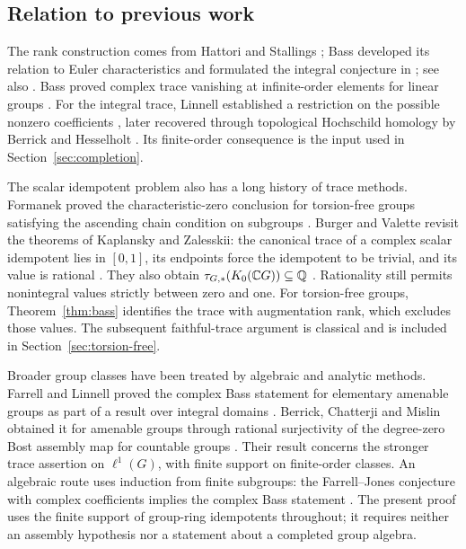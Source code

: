 \subsection{Relation to previous work}

The rank construction comes from Hattori and Stallings
\cite{Hattori1965,Stallings1965}; Bass developed its relation to Euler
characteristics and formulated the integral conjecture in
\cite{Bass1976}; see also \cite[Conjecture (4.5)]{Bass1979}.
Bass proved complex trace vanishing at infinite-order elements for linear
groups \cite[Theorem (6.1)(f)]{Bass1979}. For the integral trace,
Linnell established a restriction on the possible nonzero coefficients
\cite[Lemma 4.1]{Linnell1983}, later recovered through topological
Hochschild homology by Berrick and Hesselholt \cite[Theorem A]{BH2015}.
Its finite-order consequence is the input used in
Section~\ref{sec:completion}.

The scalar idempotent problem also has a long history of trace methods.
Formanek proved the characteristic-zero conclusion for torsion-free
groups satisfying the ascending chain condition on subgroups
\cite[Theorem 1]{Formanek1973}. Burger and Valette revisit the theorems of
Kaplansky and Zalesskii: the canonical trace of a complex scalar
idempotent lies in $[0,1]$, its endpoints force the idempotent to be
trivial, and its value is rational
\cite[Theorems 1.3 and 2.1]{BV1998}. They also obtain
$\tau_{G,*}(K_0(\mathbb C G))\subseteq\mathbb Q$
\cite[Corollary 1.2]{BV1998}. Rationality still permits nonintegral
values strictly between zero and one. For torsion-free groups,
Theorem~\ref{thm:bass} identifies the trace with augmentation rank,
which excludes those values. The subsequent faithful-trace argument
is classical and is included in Section~\ref{sec:torsion-free}.

Broader group classes have been treated by algebraic and analytic
methods. Farrell and Linnell proved the complex Bass statement for
elementary amenable groups as part of a result over integral domains
\cite[Theorem 1.6]{FarrellLinnell2003}. Berrick, Chatterji and Mislin
obtained it for amenable groups through rational surjectivity of the
degree-zero Bost assembly map for countable groups
\cite[Theorems 1.3--1.4 and Lemma 1.5]{BCM2004}. Their result concerns
the stronger trace assertion on $\ell^1(G)$, with finite support on
finite-order classes. An algebraic route uses induction from finite
subgroups: the Farrell--Jones conjecture with complex coefficients
implies the complex Bass statement
\cite[Theorems 1.5 and 1.9]{BartelsLuckReich2008}.
The present proof uses the finite support of group-ring idempotents
throughout; it requires neither an assembly hypothesis nor a statement
about a completed group algebra.


